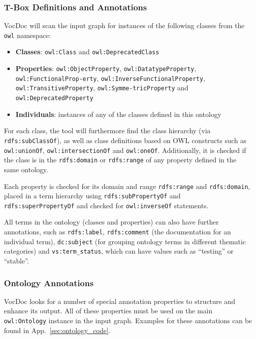 \documentclass{article}
\begin{document}
\subsubsection{T-Box Definitions and Annotations} %
\label{ssub:recognised_t_box_terms}

VocDoc will scan the input graph for instances of the following classes from the \texttt{owl} namespace:

\begin{itemize}
	\item \textbf{Classes}: \texttt{owl:Class} and \texttt{owl:DeprecatedClass}
	\item \textbf{Properties}: \texttt{owl:ObjectProperty}, \texttt{owl:DatatypeProperty}, \texttt{owl:FunctionalProp-erty}, \texttt{owl:InverseFunctionalProperty}, \texttt{owl:TransitiveProperty}, \texttt{owl:Symme-tricProperty} and \texttt{owl:DeprecatedProperty}
	\item \textbf{Individuals}: instances of any of the classes defined in this ontology
\end{itemize}

For each class, the tool will furthermore find the class hierarchy (via \texttt{rdfs:subClassOf}), as well as class definitions based on OWL constructs such as \texttt{owl:unionOf}, \texttt{owl:intersectionOf} and \texttt{owl:oneOf}. Additionally, it is checked if the class is in the \texttt{rdfs:domain} or \texttt{rdfs:range} of any property defined in the same ontology.

Each property is checked for its domain and range \texttt{rdfs:range} and \texttt{rdfs:domain}, placed in a term hierarchy using \texttt{rdfs:subPropertyOf} and \texttt{rdfs:superPropertyOf} and checked for \texttt{owl:inverseOf} statements.

All terms in the ontology (classes and properties) can also have further annotations, such as \texttt{rdfs:label}, \texttt{rdfs:comment} (the documentation for an individual term), \texttt{dc:subject} (for grouping ontology terms in different thematic categories) and \texttt{vs:term\_status}, which can have values such as ``testing'' or ``stable''.


\subsubsection{Ontology Annotations} %
\label{ssub:annotation_properties}

VocDoc looks for a number of special annotation properties to structure and enhance its output. All of these properties must be used on the main \texttt{owl:Ontology} instance in the input graph. Examples for these annotations can be found in App.~\ref{sec:ontology_code}.
\end{document}
